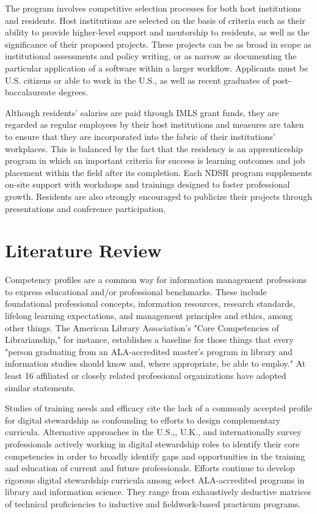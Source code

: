 \documentclass{acm_proc_article-sp}
\begin{document}
The program involves competitive selection processes for both host institutions and residents. Host institutions are selected on the basis of criteria such as their ability to provide higher-level support and mentorship to residents, as well as the significance of their proposed projects. These projects can be as broad in scope as institutional assessments and policy writing, or as narrow as documenting the particular application of a software within a larger workflow. Applicants must be U.S. citizens or able to work in the U.S., as well as recent graduates of post-baccalaureate degrees. 

Although residents' salaries are paid through IMLS grant funds, they are regarded as regular employees by their host institutions and measures are taken to ensure that they are incorporated into the fabric of their institutions' workplaces. This is balanced by the fact that the residency is an apprenticeship program in which an important criteria for success is learning outcomes and job placement within the field after its completion. Each NDSR program supplements on-site support with workshops and trainings designed to foster professional growth. Residents are also strongly encouraged to publicize their projects through presentations and conference participation. 

\section{Literature Review}
Competency profiles are a common way for information management professions to express educational and/or professional benchmarks. These include foundational professional concepts, information resources, research standards, lifelong learning expectations, and management principles and ethics, among other things. The American Library Association's "Core Competencies of Librarianship," for instance, establishes a baseline for those things that every "person graduating from an ALA-accredited master's program in library and information studies should know and, where appropriate, be able to employ."\cite{4} At least 16 affiliated or closely related professional organizations have adopted similar statements. \cite{5}

Studies of training needs and efficacy \cite{6, 7, 8} cite the lack of a commonly accepted profile for digital stewardship as confounding to efforts to design complementary curricula. Alternative approaches in the U.S.,\cite{9, 10}, U.K.\cite{11}, and internationally\cite{12, 13} survey professionals actively working in digital stewardship roles to identify their core competencies in order to broadly identify gaps and opportunities in the training and education of current and future professionals. Efforts continue to develop rigorous digital stewardship curricula among select ALA-accredited programs in library and information science. They range from exhaustively deductive matrices of technical proficiencies\cite{14} to inductive and fieldwork-based practicum programs.\cite{15}
\end{document}
